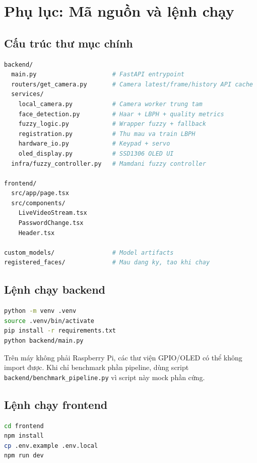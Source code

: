 \appendix
\section{Phụ lục: Mã nguồn và lệnh chạy}

\subsection{Cấu trúc thư mục chính}

\begin{lstlisting}[language=bash, caption={Cấu trúc chính của project}, label={lst:project_structure}]
backend/
  main.py                     # FastAPI entrypoint
  routers/get_camera.py       # Camera latest/frame/history API cache
  services/
    local_camera.py           # Camera worker trung tam
    face_detection.py         # Haar + LBPH + quality metrics
    fuzzy_logic.py            # Wrapper fuzzy + fallback
    registration.py           # Thu mau va train LBPH
    hardware_io.py            # Keypad + servo
    oled_display.py           # SSD1306 OLED UI
  infra/fuzzy_controller.py   # Mamdani fuzzy controller

frontend/
  src/app/page.tsx
  src/components/
    LiveVideoStream.tsx
    PasswordChange.tsx
    Header.tsx

custom_models/                # Model artifacts
registered_faces/             # Mau dang ky, tao khi chay
\end{lstlisting}

\subsection{Lệnh chạy backend}

\begin{lstlisting}[language=bash, caption={Cài đặt và chạy backend}, label={lst:backend_run}]
python -m venv .venv
source .venv/bin/activate
pip install -r requirements.txt
python backend/main.py
\end{lstlisting}

Trên máy không phải Raspberry Pi, các thư viện GPIO/OLED có thể không import được. Khi chỉ benchmark phần pipeline, dùng script \texttt{backend/benchmark\_pipeline.py} vì script này mock phần cứng.

\subsection{Lệnh chạy frontend}

\begin{lstlisting}[language=bash, caption={Cài đặt và chạy frontend}, label={lst:frontend_run}]
cd frontend
npm install
cp .env.example .env.local
npm run dev
\end{lstlisting}

